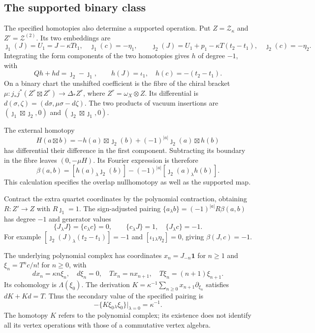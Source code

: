 \subsection{The supported binary class}

The specified homotopies also determine a supported
operation. Put $Z=\mathcal Z_\kappa$ and
$Z'=\mathcal Z^{(2)}$. Its two embeddings are
\[
 \jmath_1(J)=U_1=J-\kappa Tt_1,\quad\jmath_1(c)=-\eta_1,
 \qquad
 \jmath_2(J)=U_1+p_1-\kappa T(t_2-t_1),\quad
 \jmath_2(c)=-\eta_2.
\]
Integrating the form components of the two homotopies gives
$h$ of degree $-1$, with
\[
 Qh+hd=\jmath_2-\jmath_1,\qquad
 h(J)=\iota_1,\quad h(c)=-(t_2-t_1).
\]
On a binary chart the unshifted coefficient is the fibre
of the chiral bracket
$\mu:j_*j^*(Z^r\boxtimes Z^r)\to\Delta_*Z^r$,
where $Z^r=\omega_X\otimes Z$. Its differential is
$d(\sigma,\zeta)=(d\sigma,\mu\sigma-d\zeta)$.
The two products of vacuum insertions are
$(\jmath_1\boxtimes\jmath_2,0)$ and
$(\jmath_2\boxtimes\jmath_1,0)$.

The external homotopy
\[
 H(a\boxtimes b)=-h(a)\boxtimes\jmath_2(b)
               +(-1)^{|a|}\jmath_2(a)\boxtimes h(b)
\]
has differential their difference in the first component.
Subtracting its boundary in the fibre leaves $(0,-\mu H)$.
Its Fourier expression is therefore
\begin{equation}\label{cycen:eq:roof-bracket}
 \beta(a,b)=[h(a)_\lambda\jmath_2(b)]
                 -(-1)^{|a|}[\jmath_2(a)_\lambda h(b)].
\end{equation}
This calculation specifies the overlap nullhomotopy as well
as the supported map.

Contract the extra quartet coordinates by the polynomial
contraction, obtaining $R:Z'\to Z$ with
$R\jmath_1=1$. The sign-adjusted pairing
$\{a_\lambda b\}=(-1)^{|a|}R\beta(a,b)$ has degree $-1$
and generator values
\[
 \{J_\lambda J\}=\{c_\lambda c\}=0,\qquad
 \{c_\lambda J\}=1,\quad\{J_\lambda c\}=-1.
\]
For example $[\jmath_2(J)_\lambda(t_2-t_1)]=-1$
and $[\iota_1{}_\lambda\eta_2]=0$, giving
$\beta(J,c)=-1$.

The underlying polynomial complex has coordinates
$x_n=J_{-n}\mathbf1$ for $n\geq1$ and
$\xi_n=T^nc/n!$ for $n\geq0$, with
\[
 dx_n=\kappa n\xi_n,\quad d\xi_n=0,\quad
 Tx_n=nx_{n+1},\quad T\xi_n=(n+1)\xi_{n+1}.
\]
Its cohomology is $\Lambda(\xi_0)$. The derivation
$K=\kappa^{-1}\sum_{n\geq0}x_{n+1}\partial_{\xi_n}$
satisfies $dK+Kd=T$. Thus the secondary value of the
specified pairing is
\begin{equation}\label{cycen:eq:secondary}
 -\{K\xi_0{}_\lambda\xi_0\}\big|_{\lambda=0}
                         =\kappa^{-1}.
\end{equation}
The homotopy $K$ refers to the polynomial complex; its
existence does not identify all its vertex operations with
those of a commutative vertex algebra.


